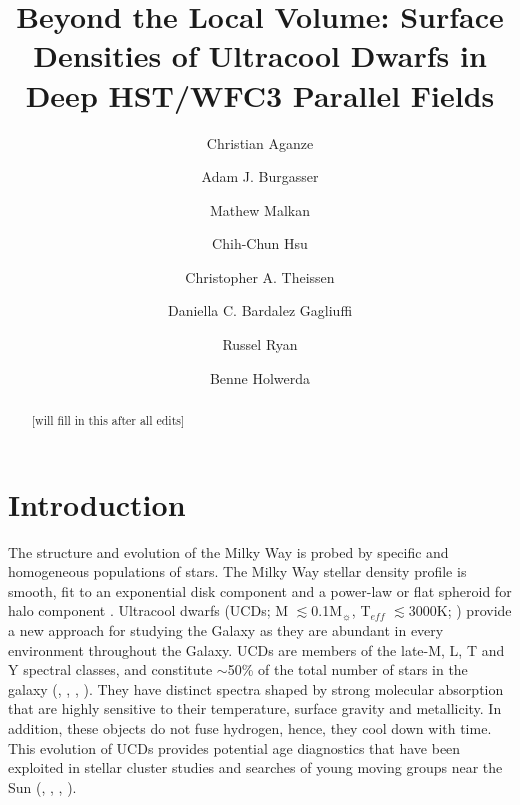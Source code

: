 \documentclass[manuscript]{aastex}
\begin{document}
\newcommand{\meth}{CH$_4$ }
\newcommand{\wat}{H$_2$O }
\newcommand{\teff}{T$_{eff}$ }
\newcommand{\Msun}{M$_\sun$}

\title{Beyond the Local Volume: Surface Densities of Ultracool Dwarfs in Deep HST/WFC3 Parallel Fields }

\author{Christian Aganze}
\author{Adam J. Burgasser }

\author{Mathew Malkan}

\author{Chih-Chun Hsu}

\author[0000-0002-9807-5435]{Christopher A. Theissen}

\author{Daniella C. Bardalez Gagliuffi}

\author{Russel Ryan}
\author{Benne Holwerda}


\begin{abstract}
[will fill in this after all edits]
\end{abstract}


\section{Introduction}

The structure and evolution of the Milky Way is probed by specific and homogeneous populations of stars. The Milky Way stellar density profile is smooth, fit to an exponential disk component and a power-law or flat spheroid for halo component \citep{2008ApJ...673..864J}. Ultracool dwarfs (UCDs; M $\lesssim$0.1\Msun, {\teff} $\lesssim$3000K; \citealt{2005ARA&A..43..195K}) provide a new approach for studying the Galaxy as they are abundant in every environment throughout the Galaxy. UCDs are members of the late-M, L, T and Y spectral classes, and constitute $\sim$50\% of the total number of stars in the galaxy (\citealt{2007AJ....133..439C}, \citealt{2000ARA&A..38..337C}, \citealt{2001RvMP...73..719B},  \citealt{2010AJ....139.2679B}). They have distinct spectra shaped by strong molecular absorption that are highly sensitive to their temperature, surface gravity and metallicity. In addition, these objects do not fuse hydrogen, hence, they cool down with time. This evolution of UCDs provides potential age diagnostics that have been exploited in stellar cluster studies \citep{1998ASPC..134..394B,luhman2012,martin2017} and searches of young moving groups near the Sun (\citealt{LopezSantiago2006}, \citealt{Gagne2015}, \citealt{Mamajek2015}, \citealt{Faherty2018}). 
\end{document}
